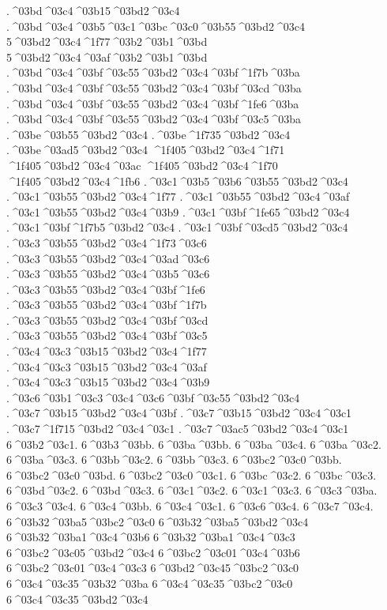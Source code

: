 {.^^^^03bd^^^^03c4^^^^03b15^^^^03bd2^^^^03c4
.^^^^03bd^^^^03c4^^^^03b5^^^^03c1^^^^03bc^^^^03c0^^^^03b55^^^^03bd2^^^^03c4
5^^^^03bd2^^^^03c4^^^^1f77^^^^03b2^^^^03b1^^^^03bd  5^^^^03bd2^^^^03c4^^^^03af^^^^03b2^^^^03b1^^^^03bd
.^^^^03bd^^^^03c4^^^^03bf^^^^03c55^^^^03bd2^^^^03c4^^^^03bf^^^^1f7b^^^^03ba  .^^^^03bd^^^^03c4^^^^03bf^^^^03c55^^^^03bd2^^^^03c4^^^^03bf^^^^03cd^^^^03ba
.^^^^03bd^^^^03c4^^^^03bf^^^^03c55^^^^03bd2^^^^03c4^^^^03bf^^^^1fe6^^^^03ba
.^^^^03bd^^^^03c4^^^^03bf^^^^03c55^^^^03bd2^^^^03c4^^^^03bf^^^^03c5^^^^03ba
.^^^^03be^^^^03b55^^^^03bd2^^^^03c4
.^^^^03be^^^^1f735^^^^03bd2^^^^03c4  .^^^^03be^^^^03ad5^^^^03bd2^^^^03c4
^^^^1f405^^^^03bd2^^^^03c4^^^^1f71  ^^^^1f405^^^^03bd2^^^^03c4^^^^03ac
^^^^1f405^^^^03bd2^^^^03c4^^^^1f70
^^^^1f405^^^^03bd2^^^^03c4^^^^1fb6
.^^^^03c1^^^^03b5^^^^03b6^^^^03b55^^^^03bd2^^^^03c4
.^^^^03c1^^^^03b55^^^^03bd2^^^^03c4^^^^1f77  .^^^^03c1^^^^03b55^^^^03bd2^^^^03c4^^^^03af
.^^^^03c1^^^^03b55^^^^03bd2^^^^03c4^^^^03b9
.^^^^03c1^^^^03bf^^^^1fe65^^^^03bd2^^^^03c4
.^^^^03c1^^^^03bf^^^^1f7b5^^^^03bd2^^^^03c4  .^^^^03c1^^^^03bf^^^^03cd5^^^^03bd2^^^^03c4
.^^^^03c3^^^^03b55^^^^03bd2^^^^03c4^^^^1f73^^^^03c6  .^^^^03c3^^^^03b55^^^^03bd2^^^^03c4^^^^03ad^^^^03c6
.^^^^03c3^^^^03b55^^^^03bd2^^^^03c4^^^^03b5^^^^03c6
.^^^^03c3^^^^03b55^^^^03bd2^^^^03c4^^^^03bf^^^^1fe6
.^^^^03c3^^^^03b55^^^^03bd2^^^^03c4^^^^03bf^^^^1f7b  .^^^^03c3^^^^03b55^^^^03bd2^^^^03c4^^^^03bf^^^^03cd
.^^^^03c3^^^^03b55^^^^03bd2^^^^03c4^^^^03bf^^^^03c5
.^^^^03c4^^^^03c3^^^^03b15^^^^03bd2^^^^03c4^^^^1f77  .^^^^03c4^^^^03c3^^^^03b15^^^^03bd2^^^^03c4^^^^03af
.^^^^03c4^^^^03c3^^^^03b15^^^^03bd2^^^^03c4^^^^03b9
.^^^^03c6^^^^03b1^^^^03c3^^^^03c4^^^^03c6^^^^03bf^^^^03c55^^^^03bd2^^^^03c4
.^^^^03c7^^^^03b15^^^^03bd2^^^^03c4^^^^03bf
.^^^^03c7^^^^03b15^^^^03bd2^^^^03c4^^^^03c1
.^^^^03c7^^^^1f715^^^^03bd2^^^^03c4^^^^03c1  .^^^^03c7^^^^03ac5^^^^03bd2^^^^03c4^^^^03c1
6^^^^03b2^^^^03c1.
6^^^^03b3^^^^03bb.
6^^^^03ba^^^^03bb.
6^^^^03ba^^^^03c4.
6^^^^03ba^^^^03c2.
6^^^^03ba^^^^03c3.
6^^^^03bb^^^^03c2.
6^^^^03bb^^^^03c3.
6^^^^03bc2^^^^03c0^^^^03bb.
6^^^^03bc2^^^^03c0^^^^03bd.
6^^^^03bc2^^^^03c0^^^^03c1.
6^^^^03bc^^^^03c2.
6^^^^03bc^^^^03c3.
6^^^^03bd^^^^03c2.
6^^^^03bd^^^^03c3.
6^^^^03c1^^^^03c2.
6^^^^03c1^^^^03c3.
6^^^^03c3^^^^03ba.
6^^^^03c3^^^^03c4.
6^^^^03c4^^^^03bb.
6^^^^03c4^^^^03c1.
6^^^^03c6^^^^03c4.
6^^^^03c7^^^^03c4.
6^^^^03b32^^^^03ba5^^^^03bc2^^^^03c0
6^^^^03b32^^^^03ba5^^^^03bd2^^^^03c4
6^^^^03b32^^^^03ba1^^^^03c4^^^^03b6
6^^^^03b32^^^^03ba1^^^^03c4^^^^03c3
6^^^^03bc2^^^^03c05^^^^03bd2^^^^03c4
6^^^^03bc2^^^^03c01^^^^03c4^^^^03b6
6^^^^03bc2^^^^03c01^^^^03c4^^^^03c3
6^^^^03bd2^^^^03c45^^^^03bc2^^^^03c0
6^^^^03c4^^^^03c35^^^^03b32^^^^03ba
6^^^^03c4^^^^03c35^^^^03bc2^^^^03c0
6^^^^03c4^^^^03c35^^^^03bd2^^^^03c4
}
